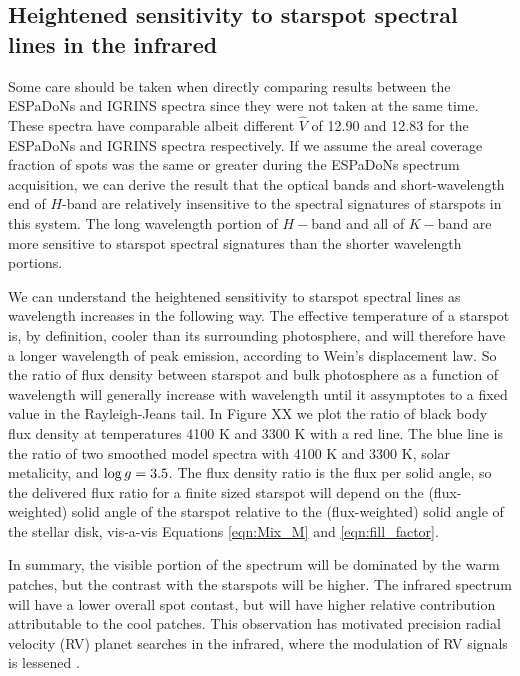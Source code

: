 \documentclass[onecolumn]{emulateapj}%
\begin{document}
\subsection{Heightened sensitivity to starspot spectral lines in the infrared}

Some care should be taken when directly comparing results between the ESPaDoNs and IGRINS spectra since they were not taken at the same time.  These spectra have comparable albeit different $\hat V$ of 12.90 and 12.83 for the ESPaDoNs and IGRINS spectra respectively.  If we assume the areal coverage fraction of spots was the same or greater during the ESPaDoNs spectrum acquisition, we can derive the result that the optical bands and short-wavelength end of $H$-band are relatively insensitive to the spectral signatures of starspots in this system.  The long wavelength portion of $H-$band and all of $K-$band are more sensitive to starspot spectral signatures than the shorter wavelength portions.

We can understand the heightened sensitivity to starspot spectral lines as wavelength increases in the following way.  The effective temperature of a starspot is, by definition, cooler than its surrounding photosphere, and will therefore have a longer wavelength of peak emission, according to Wein's displacement law.  So the ratio of flux density between starspot and bulk photosphere as a function of wavelength will generally increase with wavelength until it assymptotes to a fixed value in the Rayleigh-Jeans tail.  In Figure XX we plot the ratio of black body flux density at temperatures 4100 K and 3300 K with a red line.  The blue line is the ratio of two smoothed \PHOENIX model spectra with 4100 K and 3300 K, solar metalicity, and $\log g=3.5$.  The flux density ratio is the flux per solid angle, so the delivered flux ratio for a finite sized starspot will depend on the (flux-weighted) solid angle of the starspot relative to the (flux-weighted) solid angle of the stellar disk, vis-a-vis Equations \ref{eqn:Mix_M} and \ref{eqn:fill_factor}.  



In summary, the visible portion of the spectrum will be dominated by the warm patches, but the contrast with the starspots will be higher.  The infrared spectrum will have a lower overall spot contast, but will have higher relative contribution attributable to the cool patches.  This observation has motivated precision radial velocity (RV) planet searches in the infrared, where the modulation of RV signals is lessened \citep{2008ApJ...687L.103P}.
\end{document}
